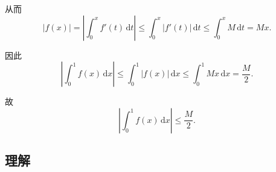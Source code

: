 \documentclass[../book.tex]{subfiles}
\begin{document}
\begin{enumerate}
\begin{circlenum}
\begin{analysisbox}
                从而
                \[
                    |f(x)| = \left| \int_0^x f'(t)\,\mathrm{d}t \right|
                    \leq
                    \int_0^x |f'(t)|\,\mathrm{d}t
                    \leq
                    \int_0^x M\,\mathrm{d}t
                    =
                    Mx.
                \]

                因此
                \[
                    \left|
                        \int_0^1 f(x)\,\mathrm{d}x
                    \right|
                    \leq
                    \int_0^1 |f(x)|\,\mathrm{d}x
                    \leq
                    \int_0^1 Mx\,\mathrm{d}x
                    =
                    \frac{M}{2}.
                \]

                故
                \[
                    \left|
                        \int_0^1 f(x)\,\mathrm{d}x
                    \right|
                    \leq
                    \frac{M}{2}.
                \]
            \end{analysisbox}
        \end{circlenum}
    \end{enumerate}

    \subsection{理解}
\end{document}
